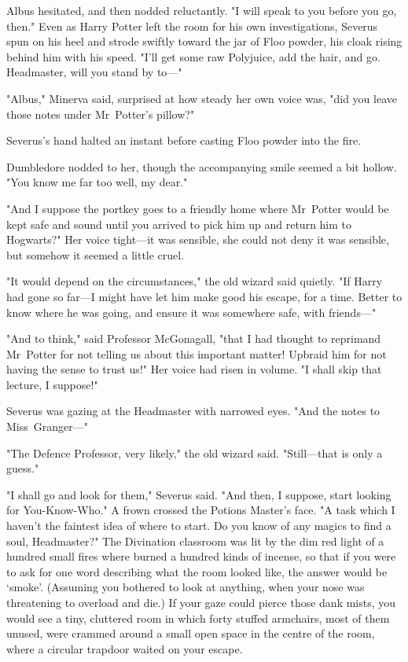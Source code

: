 Albus hesitated, and then nodded reluctantly. "I will speak to you before you
go, then."
\later
Even as Harry Potter left the room for his own investigations, Severus spun on
his heel and strode swiftly toward the jar of Floo powder, his cloak rising
behind him with his speed. "I'll get some raw Polyjuice, add the hair, and go.
Headmaster, will you stand by to—"

"Albus," Minerva said, surprised at how steady her own voice was, "did you
leave those notes under Mr~Potter's pillow?"

Severus's hand halted an instant before casting Floo powder into the fire.

Dumbledore nodded to her, though the accompanying smile seemed a bit hollow.
"You know me far too well, my dear."

"And I suppose the portkey goes to a friendly home where Mr~Potter would be
kept safe and sound until you arrived to pick him up and return him to
Hogwarts?" Her voice tight—it was sensible, she could not deny it was
sensible, but somehow it seemed a little cruel.

"It would depend on the circumstances," the old wizard said quietly. "If Harry
had gone so far—I might have let him make good his escape, for a time. Better
to know where he was going, and ensure it was somewhere safe, with friends—"

"And to think," said Professor McGonagall, "that I had thought to reprimand
Mr~Potter for not telling us about this important matter! Upbraid him for not
having the sense to trust us!" Her voice had risen in volume. "I shall skip
that lecture, I suppose!"

Severus was gazing at the Headmaster with narrowed eyes. "And the notes to
Miss~Granger—"

"The Defence Professor, very likely," the old wizard said. "Still—that is
only a guess."

"I shall go and look for them," Severus said. "And then, I suppose, start looking
for You-Know-Who." A frown crossed the Potions Master's face. "A task which
I haven't the faintest idea of where to start. Do you know of any magics to
find a soul, Headmaster?"
\later
The Divination classroom was lit by the dim red light of a hundred small fires
where burned a hundred kinds of incense, so that if you were to ask for one word
describing what the room looked like, the answer would be `smoke'. (Assuming you bothered
to look at anything, when your nose was threatening to overload and die.) If
your gaze could pierce those dank mists, you would see a tiny, cluttered room
in which forty stuffed armchairs, most of them unused, were crammed around a
small open space in the centre of the room, where a circular trapdoor waited on
your escape.


